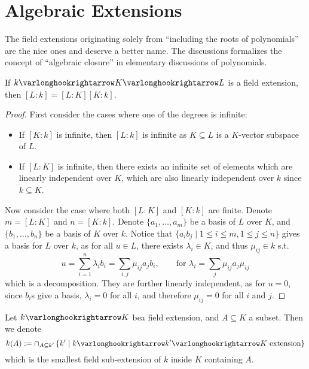\documentclass{article}
\begin{document}
\section{Algebraic Extensions}

\textstart
The field extensions originating solely from ``including the roots of polynomials'' are the nice ones and deserve a better name. The discussions formalizes the concept of ``algebraic closure'' in elementary discussions of polynomials.

\begin{proposition}\label{prop: degree of composition of field extensions}
    If $k \ext K \ext L$ is a field extension, then $[L:k] = [L:K][K:k]$.
\end{proposition}

\begin{proof}
    First consider the cases where one of the degrees is infinite: 
    \begin{itemize}
        \item If $[K : k]$ is infinite, then $[L : k]$ is infinite as $K \subseteq L$ is a $K$-vector subspace of $L$. 
        \item If $[L : K]$ is infinite, then there exists an infinite set of elements which are linearly independent over $K$, which are also linearly independent over $k$ since $k \subseteq K$.
    \end{itemize}
    Now consider the case where both $[L:K]$ and $[K:k]$ are finite. Denote $m = [L:K]$ and $n = [K:k]$. Denote $\{a_1, \dots, a_m\}$ be a basis of $L$ over $K$, and $\{b_1, \dots, b_n\}$ be a basis of $K$ over $k$. Notice that $\{a_i b_j \mid 1 \leq i \leq m, 1 \leq j \leq n\}$ gives a basis for $L$ over $k$, as for all $u \in L$, there exists $\lambda_i \in K$, and thus $\mu_{ij} \in k$ s.t.
    \[
        u = \sum_{i = 1}^n \lambda_i b_i = \sum_{i, j} \mu_{ij} a_j b_i, \qquad \text{for $\lambda_i = \sum_{j} \mu_{ij} a_j \mu_{ij}$}
    \]
    which is a decomposition. They are further linearly independent, as for $u = 0$, since $b_i$s give a basis, $\lambda_i = 0$ for all $i$, and therefore $\mu_{ij} = 0$ for all $i$ and $j$.
\end{proof}

\begin{notation}\label{not: extending field by field}
    Let $k \ext K$ bea field extension, and $A \subseteq K$ a subset. Then we denote
    \[
        k(A) := \cap_{A \subseteq k'} \left\{ k' \mid k \ext k' \ext K \text{ extension} \right\}
    \]
    which is the smallest field sub-extension of $k$ inside $K$ containing $A$. 
\end{notation}
\end{document}

